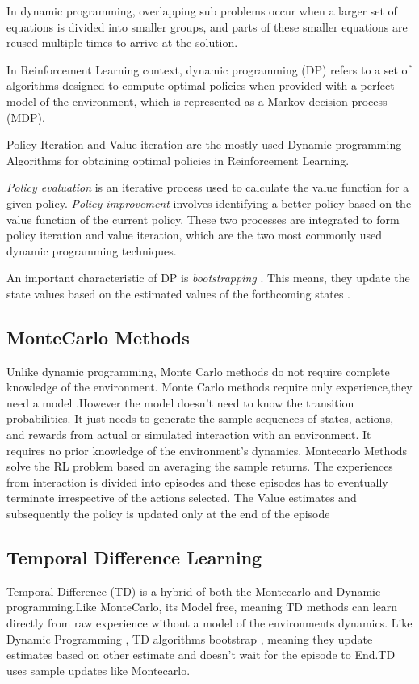\documentclass[a4paper,12pt]{Classes/RoboticsLaTeX}
\begin{document}
    In dynamic programming, overlapping sub problems occur when a larger set of equations is divided into smaller groups, and parts of these smaller equations are reused multiple times to arrive at the solution.
    
   In  Reinforcement Learning context, dynamic programming (DP) refers to a set of algorithms designed to compute optimal policies when provided with a perfect model of the environment, which is represented as a Markov decision process (MDP).\cite{Sutton_Barto_2020}

   Policy Iteration and Value iteration are the mostly used Dynamic programming Algorithms for obtaining optimal policies in Reinforcement Learning.

   \textit{Policy evaluation} is an iterative process used to calculate the value function for a given policy. \textit{Policy improvement} involves identifying a better policy based on the value function of the current policy. These two processes are integrated to form policy iteration and value iteration, which are the two most commonly used dynamic programming techniques.

   An important  characteristic of DP is \textit{bootstrapping} . This means, they update the state values based on the estimated values of the forthcoming states .

   \subsection{MonteCarlo Methods}
   Unlike dynamic programming, Monte Carlo methods do not require complete knowledge of the environment. Monte Carlo methods require only experience,they need a model .However the model doesn’t need to know the transition probabilities. It just needs to generate the sample sequences of states, actions, and rewards from actual or simulated interaction with an environment. It requires no prior knowledge of the environment’s dynamics.
    Montecarlo Methods solve the RL problem based on averaging the sample returns. The experiences from interaction is divided into episodes and these episodes has to eventually terminate irrespective of the actions selected. The Value estimates and subsequently the policy is updated only at the end of the episode \cite{Sutton_Barto_2020}

   \subsection{Temporal Difference Learning}
    Temporal Difference (TD) is a hybrid of both the Montecarlo and Dynamic programming.Like MonteCarlo, its Model free, meaning TD methods can learn directly from raw experience without a model of the environments dynamics.
    Like Dynamic Programming , TD algorithms bootstrap , meaning they update estimates based on other estimate and doesn’t wait for the episode to End.TD uses sample updates like Montecarlo.
\end{document}
